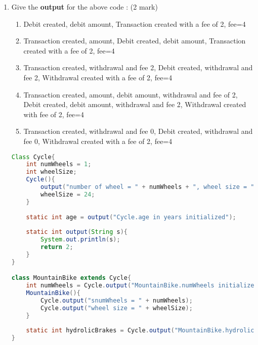 \documentclass{article}
\begin{document}
\begin{enumerate}[label=\arabic* --,resume]
	\item Give the \textbf{output} for the above code : (2 mark)
	\begin{enumerate}
		\item Debit created, debit amount, Transaction created with a fee of 2, fee=4
		\item Transaction created, amount, Debit created, debit amount, Transaction created with a fee of 2, fee=4
		\item Transaction created, withdrawal and fee 2, Debit created, withdrawal and fee 2, Withdrawal created with a fee of 2, fee=4
		\item Transaction created, amount, debit amount, withdrawal and fee of 2, Debit created, debit amount, withdrawal and fee 2, Withdrawal created with fee of 2, fee=4
		\item Transaction created, withdrawal and fee 0, Debit created, withdrawal and fee 0, Withdrawal created with a fee of 2, fee=4
	\end{enumerate}
	\begin{lstlisting}[language=Java, left=numbers]
Class Cycle{
	int numWheels = 1;
	int wheelSize;
	Cycle(){
		output("number of wheel = " + numWheels + ", wheel size = "+ wheelSize);
		wheelSize = 24;
	}
	
	static int age = output("Cycle.age in years initialized");
	
	static int output(String s){
		System.out.println(s);
		return 2;
	}
}

class MountainBike extends Cycle{
	int numWheels = Cycle.output("MountainBike.numWheels initialized");
	MountainBike(){
		Cycle.output("snumWheels = " + numWheels);
		Cycle.output("wheel size = " + wheelSize);
	}
	
	static int hydrolicBrakes = Cycle.output("MountainBike.hydrolicBrakes initialized");
}


\end{lstlisting}
\end{enumerate}
\end{document}
